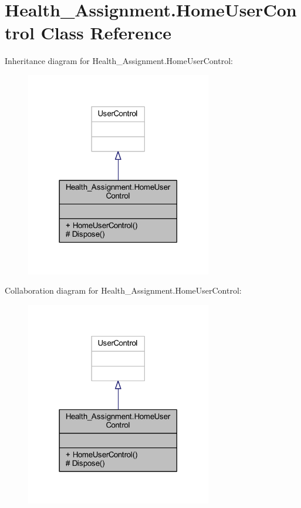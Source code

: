 \hypertarget{class_health___assignment_1_1_home_user_control}{}\section{Health\+\_\+\+Assignment.\+Home\+User\+Control Class Reference}
\label{class_health___assignment_1_1_home_user_control}


Inheritance diagram for Health\+\_\+\+Assignment.\+Home\+User\+Control\+:\nopagebreak
\begin{figure}[H]
\begin{center}
\leavevmode
\includegraphics[width=230pt]{class_health___assignment_1_1_home_user_control__inherit__graph}
\end{center}
\end{figure}


Collaboration diagram for Health\+\_\+\+Assignment.\+Home\+User\+Control\+:\nopagebreak
\begin{figure}[H]
\begin{center}
\leavevmode
\includegraphics[width=230pt]{class_health___assignment_1_1_home_user_control__coll__graph}
\end{center}
\end{figure}
